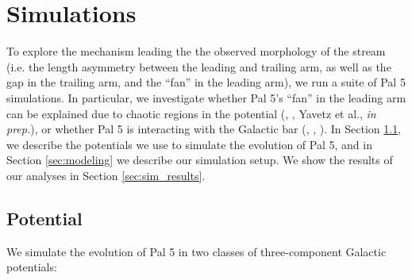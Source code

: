 \documentclass[twocolumn]{aastex62}
\begin{document}
\section{Simulations}
\label{sec:sim}
To explore the mechanism leading the the observed morphology of the stream (i.e. the length asymmetry between the leading and trailing arm, as well as the gap in the trailing arm, and the ``fan'' in the leading arm), we run a suite of Pal 5 simulations.
In particular, we investigate whether Pal 5's ``fan'' in the leading arm can be explained due to chaotic regions in the potential (\citealt{Pearson:2015}, \citealt{Price-Whelan:2016}, Yavetz et al., {\it in prep.}), or whether Pal 5 is interacting with the Galactic bar (\citealt{Erkal:2017}, \citealt{Pearson:2017}, \citealt{Banik:2019}).
In Section \ref{sec:potential}, we describe the potentials we use to simulate the evolution of Pal 5, and in Section \ref{sec:modeling} we describe our simulation setup.
We show the results of our analyses in Section \ref{sec:sim_results}.

\subsection{Potential}
\label{sec:potential}
We simulate the evolution of Pal 5 in two classes of three-component Galactic potentials:
\end{document}
